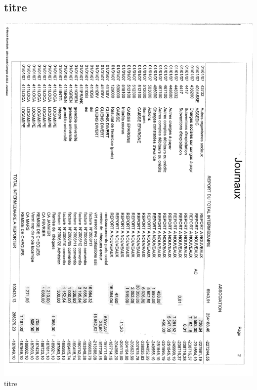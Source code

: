 \subsection{titre}
\begin{center}
\includegraphics[scale=0.6]{annexes/images/bilan_annuel_journaux_a.pdf} \\
titre
\end{center}
